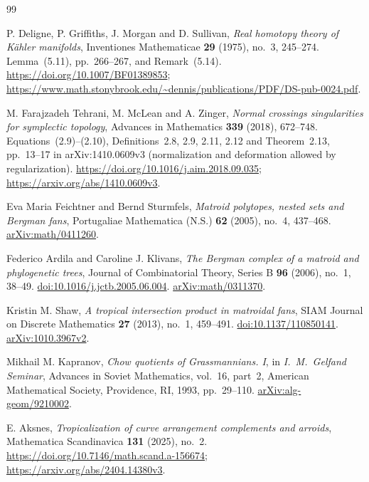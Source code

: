 \begin{thebibliography}{99}

P. Deligne, P. Griffiths, J. Morgan and D. Sullivan,
\emph{Real homotopy theory of K\"ahler manifolds},
Inventiones Mathematicae \textbf{29} (1975), no.~3, 245--274.
Lemma~(5.11), pp.~266--267, and Remark~(5.14).
\url{https://doi.org/10.1007/BF01389853};
\url{https://www.math.stonybrook.edu/~dennis/publications/PDF/DS-pub-0024.pdf}.

M. Farajzadeh Tehrani, M. McLean and A. Zinger,
\emph{Normal crossings singularities for symplectic topology},
Advances in Mathematics \textbf{339} (2018), 672--748.
Equations~(2.9)--(2.10), Definitions~2.8, 2.9, 2.11, 2.12 and Theorem~2.13,
pp.~13--17 in arXiv:1410.0609v3 (normalization and deformation allowed by regularization).
\url{https://doi.org/10.1016/j.aim.2018.09.035};
\url{https://arxiv.org/abs/1410.0609v3}.

Eva Maria Feichtner and Bernd Sturmfels,
\emph{Matroid polytopes, nested sets and Bergman fans},
Portugaliae Mathematica (N.S.) \textbf{62} (2005), no.~4, 437--468.
\href{https://arxiv.org/abs/math/0411260}{arXiv:math/0411260}.

Federico Ardila and Caroline J. Klivans,
\emph{The Bergman complex of a matroid and phylogenetic trees},
Journal of Combinatorial Theory, Series B \textbf{96} (2006), no.~1, 38--49.
\href{https://doi.org/10.1016/j.jctb.2005.06.004}{doi:10.1016/j.jctb.2005.06.004}.
\href{https://arxiv.org/abs/math/0311370}{arXiv:math/0311370}.

Kristin M. Shaw,
\emph{A tropical intersection product in matroidal fans},
SIAM Journal on Discrete Mathematics \textbf{27} (2013), no.~1, 459--491.
\href{https://doi.org/10.1137/110850141}{doi:10.1137/110850141}.
\href{https://arxiv.org/abs/1010.3967v2}{arXiv:1010.3967v2}.

Mikhail M. Kapranov,
\emph{Chow quotients of Grassmannians. I},
in \emph{I.~M.~Gelfand Seminar},
Advances in Soviet Mathematics, vol.~16, part~2,
American Mathematical Society, Providence, RI, 1993, pp.~29--110.
\href{https://arxiv.org/abs/alg-geom/9210002}{arXiv:alg-geom/9210002}.

E. Aksnes,
\emph{Tropicalization of curve arrangement complements and arroids},
Mathematica Scandinavica \textbf{131} (2025), no.~2.
\url{https://doi.org/10.7146/math.scand.a-156674};
\url{https://arxiv.org/abs/2404.14380v3}.


\end{thebibliography}

